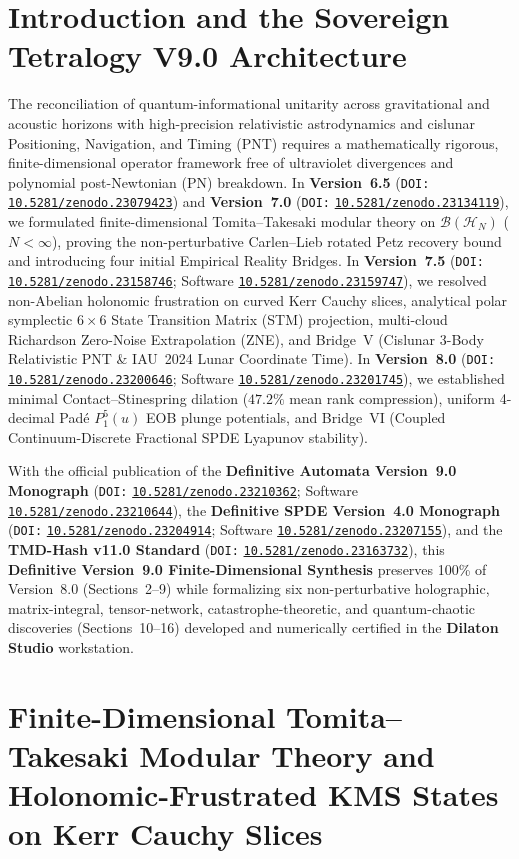 \documentclass[11pt,a4paper,reqno]{article}
\newcommand{\zenodo}[1]{\mbox{\href{https://doi.org/10.5281/zenodo.#1}{\texttt{10.5281/zenodo.#1}}}}
\theoremstyle{plain}
\theoremstyle{definition}
\theoremstyle{remark}
\numberwithin{equation}{section}
\begin{document}
\clearpage
\tableofcontents
\clearpage

\section{Introduction and the Sovereign Tetralogy V9.0 Architecture}
\label{sec:intro}

The reconciliation of quantum-informational unitarity across gravitational and acoustic horizons with high-precision relativistic astrodynamics and cislunar Positioning, Navigation, and Timing (PNT) requires a mathematically rigorous, finite-dimensional operator framework free of ultraviolet divergences and polynomial post-Newtonian (PN) breakdown. In \textbf{Version~6.5} (\texttt{DOI:} \zenodo{23079423}) and \textbf{Version~7.0} (\texttt{DOI:} \zenodo{23134119}), we formulated finite-dimensional Tomita--Takesaki modular theory on $\mathcal{B}(\mathcal{H}_N)$ ($N < \infty$), proving the non-perturbative Carlen--Lieb rotated Petz recovery bound and introducing four initial Empirical Reality Bridges. In \textbf{Version~7.5} (\texttt{DOI:} \zenodo{23158746}; Software \zenodo{23159747}), we resolved non-Abelian holonomic frustration on curved Kerr Cauchy slices, analytical polar symplectic $6\times 6$ State Transition Matrix (STM) projection, multi-cloud Richardson Zero-Noise Extrapolation (ZNE), and Bridge~V (Cislunar 3-Body Relativistic PNT \& IAU~2024 Lunar Coordinate Time). In \textbf{Version~8.0} (\texttt{DOI:} \zenodo{23200646}; Software \zenodo{23201745}), we established minimal Contact--Stinespring dilation ($47.2\%$ mean rank compression), uniform 4-decimal Pad\'e $P_1^5(u)$ EOB plunge potentials, and Bridge~VI (Coupled Continuum-Discrete Fractional SPDE Lyapunov stability).

With the official publication of the \textbf{Definitive Automata Version~9.0 Monograph} (\texttt{DOI:} \zenodo{23210362}; Software \zenodo{23210644}), the \textbf{Definitive SPDE Version~4.0 Monograph} (\texttt{DOI:} \zenodo{23204914}; Software \zenodo{23207155}), and the \textbf{TMD-Hash v11.0 Standard} (\texttt{DOI:} \zenodo{23163732}), this \textbf{Definitive Version~9.0 Finite-Dimensional Synthesis} preserves 100\% of Version~8.0 (Sections~2--9) while formalizing six non-perturbative holographic, matrix-integral, tensor-network, catastrophe-theoretic, and quantum-chaotic discoveries (Sections~10--16) developed and numerically certified in the \textbf{Dilaton Studio} workstation.
\section{Finite-Dimensional Tomita--Takesaki Modular Theory and Holonomic-Frustrated KMS States on Kerr Cauchy Slices}
\label{sec:modular_kms}
\end{document}
